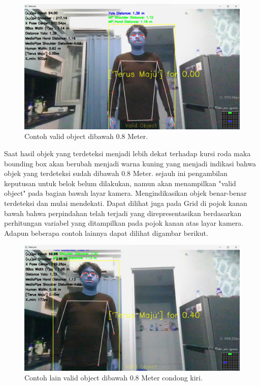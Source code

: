 \begin{figure}[H]
  \centering
  \includegraphics[scale=0.3]{gambar/posisikuning.png}
  \caption{Contoh valid object dibawah 0.8 Meter.}
  \label{fig:Valid object diatas 0.8 Meter.}
\end{figure}

Saat hasil objek yang terdeteksi menjadi lebih dekat terhadap kursi roda maka bounding box akan berubah menjadi warna kuning yang menjadi indikasi bahwa objek yang terdeteksi sudah dibawah 0.8 Meter. sejauh ini pengambilan keputusan untuk belok belum dilakukan, namun akan menampilkan "valid object" pada bagian bawah layar kamera. Mengindikasikan objek benar-benar terdeteksi dan mulai mendekati. Dapat dilihat juga pada Grid di pojok kanan bawah bahwa perpindahan telah terjadi yang direpresentasikan berdasarkan perhitungan variabel yang ditampilkan pada pojok kanan atas layar kamera. Adapun beberapa contoh lainnya dapat dilihat digambar berikut.

\begin{figure}[H]
  \centering
  \includegraphics[scale=0.3]{gambar/posisikuning kiri.png}
  \caption{Contoh lain valid object dibawah 0.8 Meter condong kiri.}
  \label{fig:Contoh lain Valid object dibawah 0.8 Meter.}
\end{figure}

